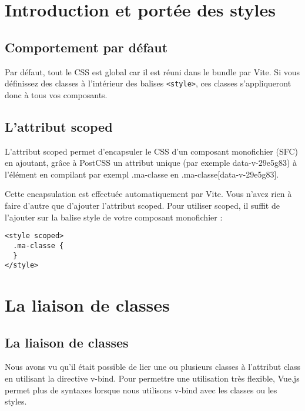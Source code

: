 \section{Introduction et portée des styles}
\subsection{Comportement par défaut}
Par défaut, tout le CSS est global car il est réuni dans le {\color{monOrange}bundle} par {\color{monOrange}Vite}. Si vous définissez des classes à l'intérieur des balises {\tt <style>}, ces classes s'appliqueront donc à tous vos composants.

\subsection{L'attribut {\color{monOrange}scoped}}
L'attribut {\color{monOrange}scoped} permet d'encapsuler le CSS d'un composant monofichier ({\color{monOrange}SFC}) en ajoutant, grâce à PostCSS un attribut unique (par exemple data-v-29e5g83) à l'élément en compilant par exempl {\color{monOrange}.ma-classe} en {\color{monOrange}.ma-classe[data-v-29e5g83]}.

Cette encapsulation est effectuée automatiquement par {\color{monOrange}Vite}. Vous n'avez rien à faire d'autre que d'ajouter l'attribut {\color{monOrange}scoped}. Pour utiliser {\color{monOrange}scoped}, il suffit de l'ajouter sur la balise style de votre composant monofichier :
\begin{verbatim}
<style scoped>
  .ma-classe {
  }
</style>
\end{verbatim}


\section{La liaison de classes}
\subsection{La liaison de classes}
Nous avons vu qu'il était possible de lier une ou plusieurs classes à l'attribut {\color{monOrange}class} en utilisant la directive {\color{monOrange}v-bind}. Pour permettre une utilisation très flexible, {\color{monOrange}Vue.js} permet plus de syntaxes lorsque nous utilisons {\color{monOrange}v-bind} avec les classes ou les styles.

